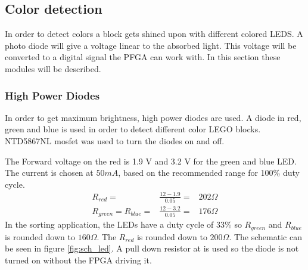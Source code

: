 \subsection{Color detection}
In order to detect colors a block gets shined upon with different colored LEDS.
A photo diode will give a voltage linear to the absorbed light.
This voltage will be converted to a digital signal the PFGA can work with.
In this section these modules will be described.
\subsubsection{High Power Diodes}
In order to get maximum brightness, high power diodes are used.
A diode in red, green and blue is used in order to detect different color LEGO blocks.
NTD5867NL mosfet was used to turn the diodes on and off.

The Forward voltage on the red is 1.9 V and 3.2 V for the green and blue LED\cite{ds:red_led,ds:gb_led}.
The current is chosen at $50 mA$, based on the recommended range for 100\% duty cycle\cite[p. 2]{apnote:led}.
\begin{eqnarray}
 R_{red} =& \frac{12-1.9}{0.05} =& 202 \Omega \nonumber \\
 R_{green} = R_{blue} =& \frac{12-3.2}{0.05} =& 176 \Omega \nonumber 
\end{eqnarray}
In the sorting application, the LEDs have a duty cycle of 33\% so $R_{green}$ and $R_{blue}$ is rounded down to $160 \Omega$.
The $R_{red}$ is rounded down to $200\Omega$.
The schematic can be seen in figure \ref{fig:sch_led}.
A pull down resistor at is used so the diode is not turned on without the FPGA driving it.


